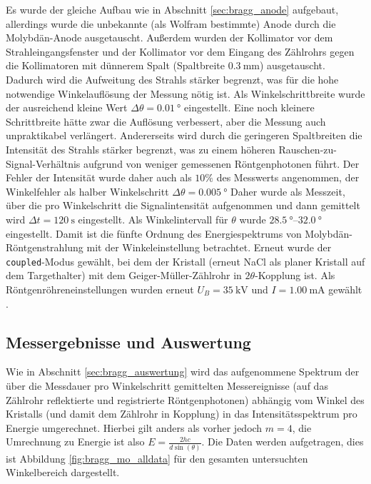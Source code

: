 Es wurde der gleiche Aufbau wie in Abschnitt \ref{sec:bragg_anode} aufgebaut, allerdings wurde die unbekannte (als Wolfram bestimmte) Anode durch die Molybdän-Anode ausgetauscht. Außerdem wurden der Kollimator vor dem Strahleingangsfenster und der Kollimator vor dem Eingang des Zählrohrs gegen die Kollimatoren mit dünnerem Spalt (Spaltbreite $\SI{0,3}{\milli\meter}$) ausgetauscht. Dadurch wird die Aufweitung des Strahls stärker begrenzt, was für die hohe notwendige Winkelauflösung der Messung nötig ist. Als Winkelschrittbreite wurde der ausreichend kleine Wert $\Delta \theta = \SI{0,01}{\degree}$ eingestellt. Eine noch kleinere Schrittbreite hätte zwar die Auflösung verbessert, aber die Messung auch unpraktikabel verlängert. Andererseits wird durch die geringeren Spaltbreiten die Intensität des Strahls stärker begrenzt, was zu einem höheren Rauschen-zu-Signal-Verhältnis aufgrund von weniger gemessenen Röntgenphotonen führt. Der Fehler der Intensität wurde daher auch als $10\%$ des Messwerts angenommen, der Winkelfehler als halber Winkelschritt $\Delta \theta = \SI{0,005}{\degree}$ Daher wurde als Messzeit, über die pro Winkelschritt die Signalintensität aufgenommen und dann gemittelt wird $\Delta t = \SI{120}{\s}$ eingestellt. Als Winkelintervall für $\theta$ wurde $\SIrange{28,5}{32,0}{\degree}$ eingestellt. Damit ist die fünfte Ordnung des Energiespektrums von Molybdän-Röntgenstrahlung mit der Winkeleinstellung betrachtet.
Erneut wurde der \texttt{coupled}-Modus gewählt, bei dem der Kristall (erneut NaCl als planer Kristall auf dem Targethalter) mit dem Geiger-Müller-Zählrohr in $2\theta$-Kopplung ist. Als Röntgenröhreneinstellungen wurden erneut $U_B=\SI{35}{\kilo\V}$ und $I=\SI{1,00}{\milli\A}$ gewählt \cite[2,5]{Versuchsanleitung428}.

\subsection{Messergebnisse und Auswertung}

Wie in Abschnitt \ref{sec:bragg_auswertung} wird das aufgenommene Spektrum der über die Messdauer pro Winkelschritt gemittelten Messereignisse (auf das Zählrohr reflektierte und registrierte Röntgenphotonen) abhängig vom Winkel des Kristalls (und damit dem Zählrohr in Kopplung) in das Intensitätsspektrum pro Energie umgerechnet. Hierbei gilt anders als vorher jedoch $m=4$, die Umrechnung zu Energie ist also $E=\frac{2hc}{d\sin{(\theta)}}$.
Die Daten werden aufgetragen, dies ist Abbildung \ref{fig:bragg_mo_alldata} für den gesamten untersuchten Winkelbereich dargestellt.

